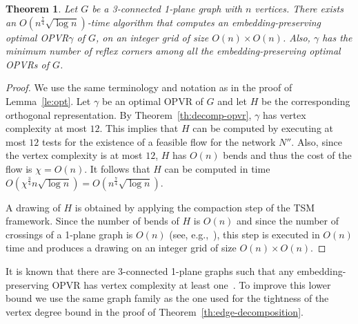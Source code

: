 \documentclass{article}
\newtheorem{theorem}{Theorem}
\newcommand{\opvr}{OPVR\xspace}
\begin{document}
\begin{theorem}\label{th:3conn-ub}
Let $G$ be a 3-connected 1-plane graph with $n$ vertices. There exists an  $O(n^{\frac{7}{4}}\sqrt{\log n})$-time algorithm that computes an embedding-preserving optimal \opvr $\gamma$ of $G$, on an integer grid of size $O(n) \times O(n)$. Also, $\gamma$ has the minimum number of reflex corners among all the embedding-preserving optimal {\opvr}s of $G$.
\end{theorem}
\begin{proof}
We use the same terminology and notation as in the proof of Lemma~\ref{le:opt}. Let $\gamma$ be an optimal \opvr of $G$ and let $H$ be the corresponding orthogonal representation. By Theorem~\ref{th:decomp-opvr}, $\gamma$ has vertex complexity at most $12$. This implies that $H$ can be computed by executing at most $12$ tests for the existence of a feasible flow for the network $N''$. Also, since the vertex complexity is at most $12$, $H$ has $O(n)$ bends and thus the cost of the flow is $\chi = O(n)$. It follows that $H$ can be computed in time $O(\chi^{\frac{3}{4}}n\sqrt{\log n})=O(n^{\frac{7}{4}}\sqrt{\log n})$.

A drawing of $H$ is obtained by applying the compaction step of the TSM framework. Since the number of bends of $H$ is $O(n)$ and since the number of crossings of a 1-plane graph is $O(n)$ (see, e.g.,~\cite{Suzuki2010}), this step is executed in $O(n)$ time and produces a drawing on an integer grid of  size $O(n) \times O(n)$.
\end{proof}


It is known that there are 3-connected 1-plane graphs such that any  embedding-preserving \opvr has vertex complexity at least one~\cite{SoCG}. To improve this lower bound we use the same graph family as the one used for the tightness of the vertex degree bound in the proof of Theorem~\ref{th:edge-decomposition}.
\end{document}
